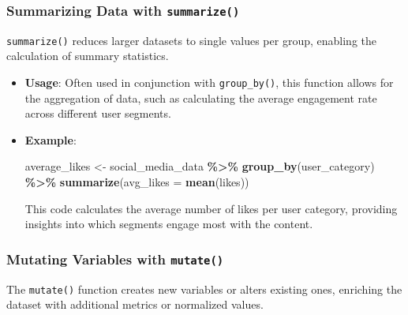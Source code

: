 \documentclass[
]{book}
\newenvironment{Shaded}{\begin{snugshade}}{\end{snugshade}}
\newcommand{\AttributeTok}[1]{\textcolor[rgb]{0.13,0.29,0.53}{#1}}
\newcommand{\FunctionTok}[1]{\textcolor[rgb]{0.13,0.29,0.53}{\textbf{#1}}}
\newcommand{\NormalTok}[1]{#1}
\newcommand{\OtherTok}[1]{\textcolor[rgb]{0.56,0.35,0.01}{#1}}
\newcommand{\SpecialCharTok}[1]{\textcolor[rgb]{0.81,0.36,0.00}{\textbf{#1}}}
\begin{document}
\hypertarget{summarizing-data-with-summarize}{%
\subsubsection{\texorpdfstring{Summarizing Data with \texttt{summarize()}}{Summarizing Data with summarize()}}\label{summarizing-data-with-summarize}}

\texttt{summarize()} reduces larger datasets to single values per group, enabling the calculation of summary statistics.

\begin{itemize}
\item
  \textbf{Usage}: Often used in conjunction with \texttt{group\_by()}, this function allows for the aggregation of data, such as calculating the average engagement rate across different user segments.
\item
  \textbf{Example}:

\begin{Shaded}
\begin{Highlighting}[]
\NormalTok{average\_likes }\OtherTok{\textless{}{-}}\NormalTok{ social\_media\_data }\SpecialCharTok{\%\textgreater{}\%}
  \FunctionTok{group\_by}\NormalTok{(user\_category) }\SpecialCharTok{\%\textgreater{}\%}
  \FunctionTok{summarize}\NormalTok{(}\AttributeTok{avg\_likes =} \FunctionTok{mean}\NormalTok{(likes))}
\end{Highlighting}
\end{Shaded}

  This code calculates the average number of likes per user category, providing insights into which segments engage most with the content.
\end{itemize}

\hypertarget{mutating-variables-with-mutate}{%
\subsubsection{\texorpdfstring{Mutating Variables with \texttt{mutate()}}{Mutating Variables with mutate()}}\label{mutating-variables-with-mutate}}

The \texttt{mutate()} function creates new variables or alters existing ones, enriching the dataset with additional metrics or normalized values.
\end{document}

